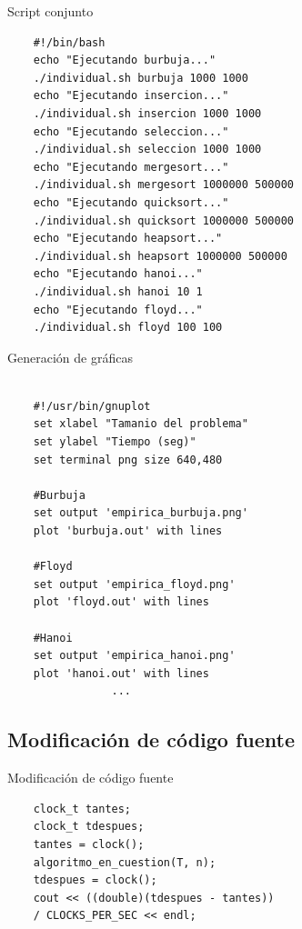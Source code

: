 \documentclass{beamer}
\begin{document}
\begin{frame}[fragile]{Script conjunto}
\begin{verbatim}
	#!/bin/bash
	echo "Ejecutando burbuja..."
	./individual.sh burbuja 1000 1000
	echo "Ejecutando insercion..."
	./individual.sh insercion 1000 1000
	echo "Ejecutando seleccion..."
	./individual.sh seleccion 1000 1000
	echo "Ejecutando mergesort..."
	./individual.sh mergesort 1000000 500000
	echo "Ejecutando quicksort..."
	./individual.sh quicksort 1000000 500000
	echo "Ejecutando heapsort..."
	./individual.sh heapsort 1000000 500000
	echo "Ejecutando hanoi..."
	./individual.sh hanoi 10 1
	echo "Ejecutando floyd..."
	./individual.sh floyd 100 100
\end{verbatim}

\end{frame}

\begin{frame}[fragile]{Generación de gráficas}

\begin{verbatim}

	#!/usr/bin/gnuplot
	set xlabel "Tamanio del problema"
	set ylabel "Tiempo (seg)"
	set terminal png size 640,480
	
	#Burbuja
	set output 'empirica_burbuja.png'
	plot 'burbuja.out' with lines

	#Floyd
	set output 'empirica_floyd.png'
	plot 'floyd.out' with lines

	#Hanoi
	set output 'empirica_hanoi.png'
	plot 'hanoi.out' with lines
				...
\end{verbatim}
\end{frame}

\subsection{Modificación de código fuente}

\begin{frame}[fragile]{Modificación de código fuente}
\begin{verbatim}
	clock_t tantes;
	clock_t tdespues;
	tantes = clock();
	algoritmo_en_cuestion(T, n);
	tdespues = clock();
	cout << ((double)(tdespues - tantes))
	/ CLOCKS_PER_SEC << endl;
\end{verbatim}
\end{frame}
\end{document}
